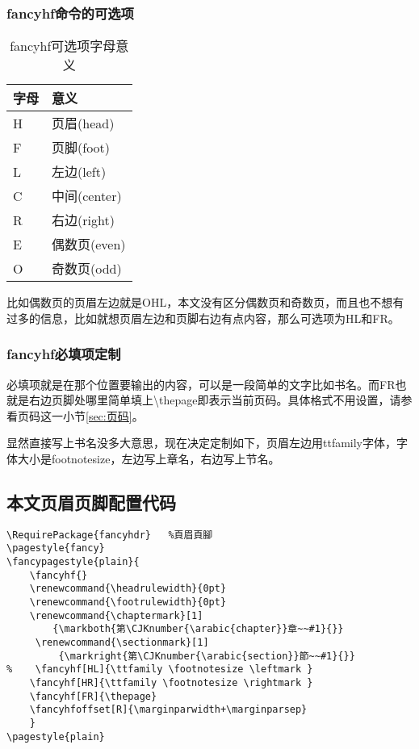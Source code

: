 \subsubsection{fancyhf命令的可选项}
\begin{table}[h]
\begin{tabular}{@{}ll@{}}
\toprule
字母 & 意义  \\ \midrule
H  & 页眉(head)  \\
F  & 页脚(foot)  \\
L  & 左边(left)  \\
C  & 中间(center)  \\
R  & 右边(right)  \\
E  & 偶数页(even) \\
O  & 奇数页(odd) \\ \bottomrule
\end{tabular}
\label{tab:fancyhf可选项字母意义}
\caption{fancyhf可选项字母意义}
\end{table}
比如偶数页的页眉左边就是OHL，本文没有区分偶数页和奇数页，而且也不想有过多的信息，比如就想页眉左边和页脚右边有点内容，那么可选项为HL和FR。

\subsubsection{fancyhf必填项定制}
必填项就是在那个位置要输出的内容，可以是一段简单的文字比如书名。而FR也就是右边页脚处哪里简单填上\textbackslash thepage即表示当前页码。具体格式不用设置，请参看页码这一小节\ref{sec:页码}。

显然直接写上书名没多大意思，现在决定定制如下，页眉左边用ttfamily字体，字体大小是footnotesize，左边写上章名，右边写上节名。

\subsection{本文页眉页脚配置代码}
\begin{verbatim}
\RequirePackage{fancyhdr}   %頁眉頁腳
\pagestyle{fancy}
\fancypagestyle{plain}{
    \fancyhf{}
    \renewcommand{\headrulewidth}{0pt}
    \renewcommand{\footrulewidth}{0pt}
    \renewcommand{\chaptermark}[1]
        {\markboth{第\CJKnumber{\arabic{chapter}}章~~#1}{}} 
     \renewcommand{\sectionmark}[1]
         {\markright{第\CJKnumber{\arabic{section}}節~~#1}{}} 
%    \fancyhf[HL]{\ttfamily \footnotesize \leftmark }
    \fancyhf[HR]{\ttfamily \footnotesize \rightmark }
    \fancyhf[FR]{\thepage}
    \fancyhfoffset[R]{\marginparwidth+\marginparsep}
    }
\pagestyle{plain} 
\end{verbatim}

